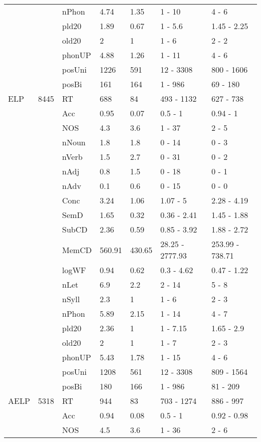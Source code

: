 \begin{table}[ht]
\begin{tabular}{lllllll}
   &  & nPhon & 4.74 & 1.35 & 1 - 10 & 4 - 6 \\ 
   &  & pld20 & 1.89 & 0.67 & 1 - 5.6 & 1.45 - 2.25 \\ 
   &  & old20 & 2 & 1 & 1 - 6 & 2 - 2 \\ 
   &  & phonUP & 4.88 & 1.26 & 1 - 11 & 4 - 6 \\ 
   &  & posUni & 1226 & 591 & 12 - 3308 & 800 - 1606 \\ 
   &  & posBi & 161 & 164 & 1 - 986 & 69 - 180 \\ 
  ELP & 8445 & RT & 688 & 84 & 493 - 1132 & 627 - 738 \\ 
   &  & Acc & 0.95 & 0.07 & 0.5 - 1 & 0.94 - 1 \\ 
   &  & NOS & 4.3 & 3.6 & 1 - 37 & 2 - 5 \\ 
   &  & nNoun & 1.8 & 1.8 & 0 - 14 & 0 - 3 \\ 
   &  & nVerb & 1.5 & 2.7 & 0 - 31 & 0 - 2 \\ 
   &  & nAdj & 0.8 & 1.5 & 0 - 18 & 0 - 1 \\ 
   &  & nAdv & 0.1 & 0.6 & 0 - 15 & 0 - 0 \\ 
   &  & Conc & 3.24 & 1.06 & 1.07 - 5 & 2.28 - 4.19 \\ 
   &  & SemD & 1.65 & 0.32 & 0.36 - 2.41 & 1.45 - 1.88 \\ 
   &  & SubCD & 2.36 & 0.59 & 0.85 - 3.92 & 1.88 - 2.72 \\ 
   &  & MemCD & 560.91 & 430.65 & 28.25 - 2777.93 & 253.99 - 738.71 \\ 
   &  & logWF & 0.94 & 0.62 & 0.3 - 4.62 & 0.47 - 1.22 \\ 
   &  & nLet & 6.9 & 2.2 & 2 - 14 & 5 - 8 \\ 
   &  & nSyll & 2.3 & 1 & 1 - 6 & 2 - 3 \\ 
   &  & nPhon & 5.89 & 2.15 & 1 - 14 & 4 - 7 \\ 
   &  & pld20 & 2.36 & 1 & 1 - 7.15 & 1.65 - 2.9 \\ 
   &  & old20 & 2 & 1 & 1 - 7 & 2 - 3 \\ 
   &  & phonUP & 5.43 & 1.78 & 1 - 15 & 4 - 6 \\ 
   &  & posUni & 1208 & 561 & 12 - 3308 & 809 - 1564 \\ 
   &  & posBi & 180 & 166 & 1 - 986 & 81 - 209 \\ 
  AELP & 5318 & RT & 944 & 83 & 703 - 1274 & 886 - 997 \\ 
   &  & Acc & 0.94 & 0.08 & 0.5 - 1 & 0.92 - 0.98 \\ 
   &  & NOS & 4.5 & 3.6 & 1 - 36 & 2 - 6 \\ 

\end{tabular}
\end{table}
